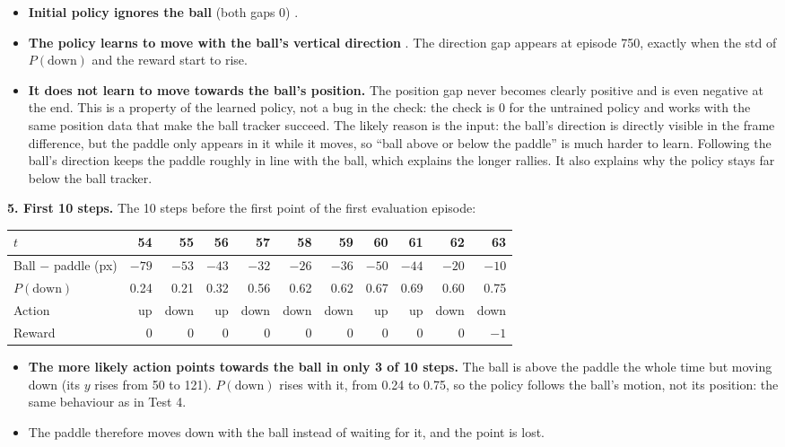 \begin{itemize}
  \item \textbf{Initial policy ignores the ball} (both gaps 0) \pass.
  \item \textbf{The policy learns to move with the ball's vertical direction} \pass. The direction gap appears at episode 750, exactly when the std of $P(\text{down})$ and the reward start to rise.
  \item \fail{} \textbf{It does not learn to move towards the ball's position.} The position gap never becomes clearly positive and is even negative at the end. This is a property of the learned policy, not a bug in the check: the check is 0 for the untrained policy and works with the same position data that make the ball tracker succeed. The likely reason is the input: the ball's direction is directly visible in the frame difference, but the paddle only appears in it while it moves, so ``ball above or below the paddle'' is much harder to learn. Following the ball's direction keeps the paddle roughly in line with the ball, which explains the longer rallies. It also explains why the policy stays far below the ball tracker.
\end{itemize}

\textbf{5. First 10 steps.} The 10 steps before the first point of the first evaluation episode:

\begin{center}
\small
\setlength{\tabcolsep}{4.5pt}
\begin{tabular}{@{}l*{10}{r}@{}}
  \toprule
  $t$ & 54 & 55 & 56 & 57 & 58 & 59 & 60 & 61 & 62 & 63 \\
  \midrule
  Ball $-$ paddle (px) & $-79$ & $-53$ & $-43$ & $-32$ & $-26$ & $-36$ & $-50$ & $-44$ & $-20$ & $-10$ \\
  $P(\text{down})$ & 0.24 & 0.21 & 0.32 & 0.56 & 0.62 & 0.62 & 0.67 & 0.69 & 0.60 & 0.75 \\
  Action & up & down & up & down & down & down & up & up & down & down \\
  Reward & 0 & 0 & 0 & 0 & 0 & 0 & 0 & 0 & 0 & $-1$ \\
  \bottomrule
\end{tabular}
\end{center}

\begin{itemize}
  \item \fail{} \textbf{The more likely action points towards the ball in only 3 of 10 steps.} The ball is above the paddle the whole time but moving down (its $y$ rises from 50 to 121). $P(\text{down})$ rises with it, from 0.24 to 0.75, so the policy follows the ball's motion, not its position: the same behaviour as in Test 4.
  \item The paddle therefore moves down with the ball instead of waiting for it, and the point is lost.
\end{itemize}

